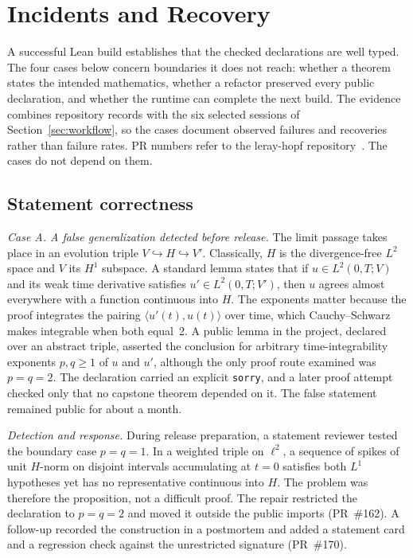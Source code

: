 \section{Incidents and Recovery}\label{sec:incidents}

A successful Lean build establishes that the checked declarations are
well typed. The four cases below concern boundaries it does not reach:
whether a theorem states the intended mathematics, whether a refactor
preserved every public declaration, and whether the runtime can complete
the next build. The evidence combines repository records with the six selected sessions
of Section~\ref{sec:workflow}, so the cases document observed failures
and recoveries rather than failure rates. PR numbers refer to the leray-hopf
repository~\cite{lerayhopf2026repo}. The cases do not depend on them.

\subsection{Statement correctness}\label{sec:inc001}

\emph{Case A. A false generalization detected before release.}
The limit passage takes place in an evolution triple
$V \hookrightarrow H \hookrightarrow V'$. Classically, $H$ is the
divergence-free $L^2$ space and $V$ its $H^1$ subspace. A standard lemma
states that if $u \in L^2(0,T;V)$ and its weak time derivative satisfies
$u' \in L^2(0,T;V')$, then $u$ agrees almost everywhere with a function
continuous into $H$. The exponents matter because the proof integrates the
pairing $\langle u'(t), u(t)\rangle$ over time, which Cauchy--Schwarz makes
integrable when both equal~2. A public lemma in the project, declared over
an abstract triple, asserted the conclusion for arbitrary time-integrability
exponents $p,q\geq 1$ of $u$ and $u'$, although the only proof route
examined was $p=q=2$. The declaration carried an explicit \texttt{sorry},
and a later proof attempt checked only that no capstone theorem depended on
it. The false statement remained public for about a month. %

\emph{Detection and response.}
During release preparation, a statement reviewer tested the boundary case
$p=q=1$. In a weighted triple on $\ell^2$, a sequence of spikes of unit
$H$-norm on disjoint intervals accumulating at $t=0$ satisfies both $L^1$
hypotheses yet has no representative continuous into $H$. The problem was
therefore the proposition, not a difficult proof. The repair restricted the
declaration to $p=q=2$ and moved it outside the public imports
(PR~\#162). A follow-up recorded the construction in a postmortem and
added a statement card and a regression check against the unrestricted
signature (PR~\#170).

